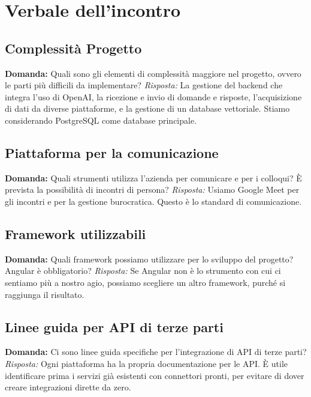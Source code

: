 \documentclass{article}
\begin{document}
\section{Verbale dell'incontro}

\subsection{Complessità Progetto} \textbf{Domanda:} Quali sono gli elementi di complessità maggiore nel progetto, ovvero le parti più difficili da implementare?
\newline
\textit{Risposta:} La gestione del backend che integra l'uso di OpenAI, la ricezione e invio di domande e risposte, l'acquisizione di dati da diverse piattaforme, e la gestione di un database vettoriale. Stiamo considerando PostgreSQL come database principale.

\subsection{Piattaforma per la comunicazione} \textbf{Domanda:} Quali strumenti utilizza l'azienda per comunicare e per i colloqui? È prevista la possibilità di incontri di persona?
\newline
\textit{Risposta:} Usiamo Google Meet per gli incontri e per la gestione burocratica. Questo è lo standard di comunicazione.

\subsection{Framework utilizzabili} \textbf{Domanda:} Quali framework possiamo utilizzare per lo sviluppo del progetto? Angular è obbligatorio?
\newline
\textit{Risposta:} Se Angular non è lo strumento con cui ci sentiamo più a nostro agio, possiamo scegliere un altro framework, purché si raggiunga il risultato.

\subsection{Linee guida per API di terze parti} \textbf{Domanda:} Ci sono linee guida specifiche per l'integrazione di API di terze parti?
\newline
\textit{Risposta:} Ogni piattaforma ha la propria documentazione per le API. È utile identificare prima i servizi già esistenti con connettori pronti, per evitare di dover creare integrazioni dirette da zero.
\end{document}
